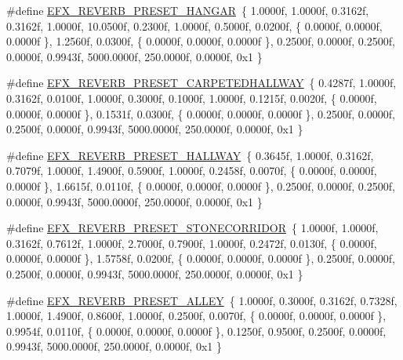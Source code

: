 \begin{DoxyCompactItemize}
\item 
\#define \mbox{\hyperlink{efx-presets_8h_a191cdef4e04feae0911f89da86fa1afe}{E\+F\+X\+\_\+\+R\+E\+V\+E\+R\+B\+\_\+\+P\+R\+E\+S\+E\+T\+\_\+\+H\+A\+N\+G\+AR}}~\{ 1.\+0000f, 1.\+0000f, 0.\+3162f, 0.\+3162f, 1.\+0000f, 10.\+0500f, 0.\+2300f, 1.\+0000f, 0.\+5000f, 0.\+0200f, \{ 0.\+0000f, 0.\+0000f, 0.\+0000f \}, 1.\+2560f, 0.\+0300f, \{ 0.\+0000f, 0.\+0000f, 0.\+0000f \}, 0.\+2500f, 0.\+0000f, 0.\+2500f, 0.\+0000f, 0.\+9943f, 5000.\+0000f, 250.\+0000f, 0.\+0000f, 0x1 \}
\item 
\#define \mbox{\hyperlink{efx-presets_8h_a178ed1682d59effcaa37ee1bb6ee69c1}{E\+F\+X\+\_\+\+R\+E\+V\+E\+R\+B\+\_\+\+P\+R\+E\+S\+E\+T\+\_\+\+C\+A\+R\+P\+E\+T\+E\+D\+H\+A\+L\+L\+W\+AY}}~\{ 0.\+4287f, 1.\+0000f, 0.\+3162f, 0.\+0100f, 1.\+0000f, 0.\+3000f, 0.\+1000f, 1.\+0000f, 0.\+1215f, 0.\+0020f, \{ 0.\+0000f, 0.\+0000f, 0.\+0000f \}, 0.\+1531f, 0.\+0300f, \{ 0.\+0000f, 0.\+0000f, 0.\+0000f \}, 0.\+2500f, 0.\+0000f, 0.\+2500f, 0.\+0000f, 0.\+9943f, 5000.\+0000f, 250.\+0000f, 0.\+0000f, 0x1 \}
\item 
\#define \mbox{\hyperlink{efx-presets_8h_a5e2ae3a6889f4c3cce4a7fbffa6f5959}{E\+F\+X\+\_\+\+R\+E\+V\+E\+R\+B\+\_\+\+P\+R\+E\+S\+E\+T\+\_\+\+H\+A\+L\+L\+W\+AY}}~\{ 0.\+3645f, 1.\+0000f, 0.\+3162f, 0.\+7079f, 1.\+0000f, 1.\+4900f, 0.\+5900f, 1.\+0000f, 0.\+2458f, 0.\+0070f, \{ 0.\+0000f, 0.\+0000f, 0.\+0000f \}, 1.\+6615f, 0.\+0110f, \{ 0.\+0000f, 0.\+0000f, 0.\+0000f \}, 0.\+2500f, 0.\+0000f, 0.\+2500f, 0.\+0000f, 0.\+9943f, 5000.\+0000f, 250.\+0000f, 0.\+0000f, 0x1 \}
\item 
\#define \mbox{\hyperlink{efx-presets_8h_a8224ffb5a04a2c06c7e2d9fe2b38a06c}{E\+F\+X\+\_\+\+R\+E\+V\+E\+R\+B\+\_\+\+P\+R\+E\+S\+E\+T\+\_\+\+S\+T\+O\+N\+E\+C\+O\+R\+R\+I\+D\+OR}}~\{ 1.\+0000f, 1.\+0000f, 0.\+3162f, 0.\+7612f, 1.\+0000f, 2.\+7000f, 0.\+7900f, 1.\+0000f, 0.\+2472f, 0.\+0130f, \{ 0.\+0000f, 0.\+0000f, 0.\+0000f \}, 1.\+5758f, 0.\+0200f, \{ 0.\+0000f, 0.\+0000f, 0.\+0000f \}, 0.\+2500f, 0.\+0000f, 0.\+2500f, 0.\+0000f, 0.\+9943f, 5000.\+0000f, 250.\+0000f, 0.\+0000f, 0x1 \}
\item 
\#define \mbox{\hyperlink{efx-presets_8h_a9d007a740c938eb36c9bc66020999706}{E\+F\+X\+\_\+\+R\+E\+V\+E\+R\+B\+\_\+\+P\+R\+E\+S\+E\+T\+\_\+\+A\+L\+L\+EY}}~\{ 1.\+0000f, 0.\+3000f, 0.\+3162f, 0.\+7328f, 1.\+0000f, 1.\+4900f, 0.\+8600f, 1.\+0000f, 0.\+2500f, 0.\+0070f, \{ 0.\+0000f, 0.\+0000f, 0.\+0000f \}, 0.\+9954f, 0.\+0110f, \{ 0.\+0000f, 0.\+0000f, 0.\+0000f \}, 0.\+1250f, 0.\+9500f, 0.\+2500f, 0.\+0000f, 0.\+9943f, 5000.\+0000f, 250.\+0000f, 0.\+0000f, 0x1 \}

\end{DoxyCompactItemize}
